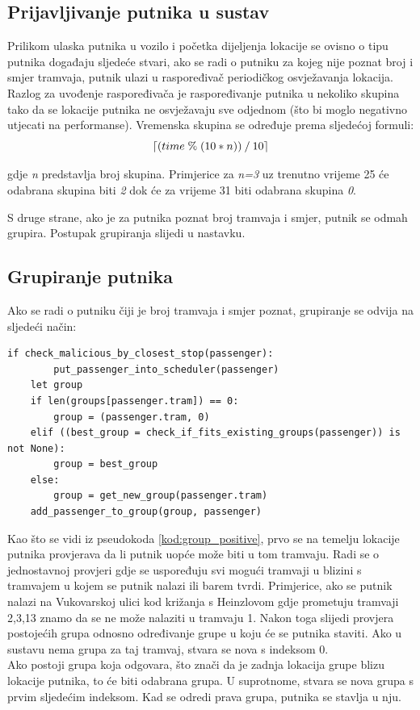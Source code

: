 \documentclass[times, utf8, diplomski]{fer}
\DeclarePairedDelimiter\ceil{\lceil}{\rceil}
\begin{document}
\subsection{Prijavljivanje putnika u sustav}
Prilikom ulaska putnika u vozilo i početka dijeljenja lokacije se ovisno o tipu putnika događaju sljedeće stvari, ako se radi o putniku za kojeg nije poznat broj i smjer tramvaja, putnik ulazi u raspoređivač periodičkog osvježavanja lokacija. Razlog za uvođenje raspoređivača je raspoređivanje putnika u nekoliko skupina tako da se lokacije putnika ne osvježavaju sve odjednom (što bi moglo negativno utjecati na performanse). Vremenska skupina se određuje prema sljedećoj formuli:
\begin{equation} \label{formula:schedule_time}
    \ceil*{(time\;\%\;(10*n))\:/\:10}
\end{equation}

gdje \emph{n} predstavlja broj skupina. Primjerice za \emph{n=3} uz trenutno vrijeme 25 će odabrana skupina biti \emph{2} dok će za vrijeme 31 biti odabrana skupina \emph{0}.

S druge strane, ako je za putnika poznat broj tramvaja i smjer, putnik se odmah grupira. Postupak grupiranja slijedi u nastavku.


\subsection{Grupiranje putnika}
Ako se radi o putniku čiji je broj tramvaja i smjer poznat, grupiranje se odvija na sljedeći način:

\begin{lstlisting}[caption={Grupiranje putnika s poznatim podacima},captionpos=b,label={kod:group_positive}]
    if check_malicious_by_closest_stop(passenger):
        put_passenger_into_scheduler(passenger)
    let group
    if len(groups[passenger.tram]) == 0:
        group = (passenger.tram, 0)
    elif ((best_group = check_if_fits_existing_groups(passenger)) is not None):
        group = best_group
    else:
        group = get_new_group(passenger.tram)
    add_passenger_to_group(group, passenger)

\end{lstlisting}

Kao što se vidi iz pseudokoda \ref{kod:group_positive}, prvo se na temelju lokacije putnika provjerava da li putnik uopće može biti u tom tramvaju. Radi se o jednostavnoj provjeri gdje se uspoređuju svi mogući tramvaji u blizini s tramvajem u kojem se putnik nalazi ili barem tvrdi. Primjerice, ako se putnik nalazi na Vukovarskoj ulici kod križanja s Heinzlovom gdje prometuju tramvaji 2,3,13 znamo da se ne može nalaziti u tramvaju 1.
Nakon toga slijedi provjera postojećih grupa odnosno određivanje grupe u koju će se putnika staviti. Ako u sustavu nema grupa za taj tramvaj, stvara se nova s indeksom 0.\\
Ako postoji grupa koja odgovara, što znači da je zadnja lokacija grupe blizu lokacije putnika, to će biti odabrana grupa.
U suprotnome, stvara se nova grupa s prvim sljedećim indeksom.
Kad se odredi prava grupa, putnika se stavlja u nju.
\end{document}
